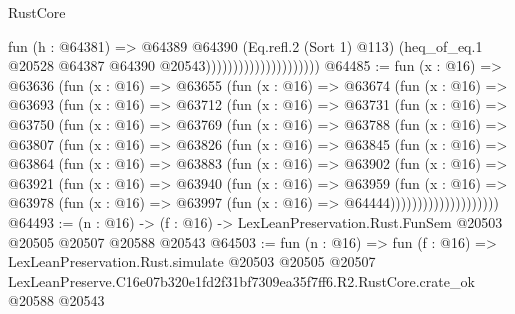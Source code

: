 \begin{lexlean}{RustCore}
\begin{coremodule}
                                          fun (h : @64381) =>
                                          @64389
                                            @64390
                                            (Eq.refl.{2} (Sort 1) @113)
                                            (heq_of_eq.{1}
                                              @20528
                                              @64387
                                              @64390
                                              @20543)))))))))))))))))))))
@64485 := fun (x : @16) =>
  @63636
    (fun (x : @16) =>
    @63655
      (fun (x : @16) =>
      @63674
        (fun (x : @16) =>
        @63693
          (fun (x : @16) =>
          @63712
            (fun (x : @16) =>
            @63731
              (fun (x : @16) =>
              @63750
                (fun (x : @16) =>
                @63769
                  (fun (x : @16) =>
                  @63788
                    (fun (x : @16) =>
                    @63807
                      (fun (x : @16) =>
                      @63826
                        (fun (x : @16) =>
                        @63845
                          (fun (x : @16) =>
                          @63864
                            (fun (x : @16) =>
                            @63883
                              (fun (x : @16) =>
                              @63902
                                (fun (x : @16) =>
                                @63921
                                  (fun (x : @16) =>
                                  @63940
                                    (fun (x : @16) =>
                                    @63959
                                      (fun (x : @16) =>
                                      @63978
                                        (fun (x : @16) =>
                                        @63997 (fun (x : @16) => @64444))))))))))))))))))))
@64493 := (n : @16) ->
  (f : @16) -> LexLeanPreservation.Rust.FunSem @20503 @20505 @20507 @20588 @20543
@64503 := fun (n : @16) =>
  fun (f : @16) =>
  LexLeanPreservation.Rust.simulate
    @20503
    @20505
    @20507
    LexLeanPreserve.C16e07b320e1fd2f31bf7309ea35f7ff6.R2.RustCore.crate_ok
    @20588
    @20543
\end{coremodule}
\end{lexlean}
